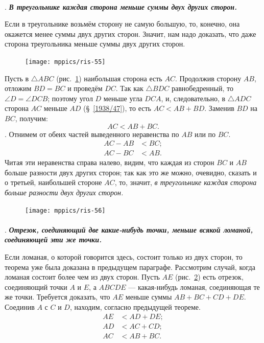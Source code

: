 \documentclass[oneside]{book}
\begin{document}
\paragraph{}\label{1938/50}
.
\textbf{\emph{В треугольнике каждая сторона меньше суммы двух других сторон.}}

Если в треугольнике возьмём сторону не самую большую, то, конечно, она окажется менее суммы двух других сторон.
Значит, нам надо доказать, что даже  сторона треугольника меньше суммы двух других сторон.

\begin{figure}
\centering
\texttt{[image: mppics/ris-55]}
\caption{}\label{1938/ris-55}
\end{figure}

Пусть в $\triangle ABC$ (рис.~\ref{1938/ris-55}) наибольшая сторона есть $AC$.
Продолжив сторону $AB$, отложим $BD=BC$ и проведём $DC$.
Так как $\triangle BDC$ равнобедренный, то $\angle D = \angle DCB$;
поэтому угол $D$ меньше угла $DCA$, и, следовательно, в $\triangle ADC$ сторона $AC$ меньше $AD$ (§~\ref{1938/47}), то есть
$AC < AB + BD$.
Заменив $BD$ на $BC$, получим:
\[AC < AB + BC.\]
\smallskip
{}.
Отнимем от обеих частей выведенного неравенства по $AB$ или по $BC$.
\begin{align*}
AC-AB&<BC;
\\
AC-BC&<AB.
\end{align*}
Читая эти неравенства справа налево, видим, что каждая из сторон $BC$ и $AB$ больше разности двух других сторон;
так как это же можно, очевидно, сказать и о третьей, наибольшей стороне $AC$, то, значит, \emph{в треугольнике каждая сторона больше разности двух других сторон.}

\begin{figure}
\centering
\texttt{[image: mppics/ris-56]}
\caption{}\label{1938/ris-56}
\end{figure}

\paragraph{}\label{1938/51}
\mbox{.}
\textbf{\emph{Отрезок, соединяющий две какие-нибудь точки, меньше всякой ломаной, соединяющей эти же точки.}}

Если ломаная, о которой говорится здесь, состоит только из двух сторон, то теорема уже была доказана в предыдущем параграфе.
Рассмотрим случай, когда ломаная состоит более чем из двух сторон.
Пусть $AE$ (рис.~\ref{1938/ris-56}) есть отрезок, соединяющий точки $A$ и $E$, а $ABCDE$ — какая-нибудь ломаная, соединяющая те же точки.
Требуется доказать, что $AE$ меньше суммы $AB+BC+CD+DE$.
Соединив $A$ с $C$ и $D$, находим, согласно предыдущей теореме.
\begin{align*}
AE&<AD+DE;
\\
AD&<AC +CD;
\\
AC&<AB+BC.
\end{align*}
\end{document}
